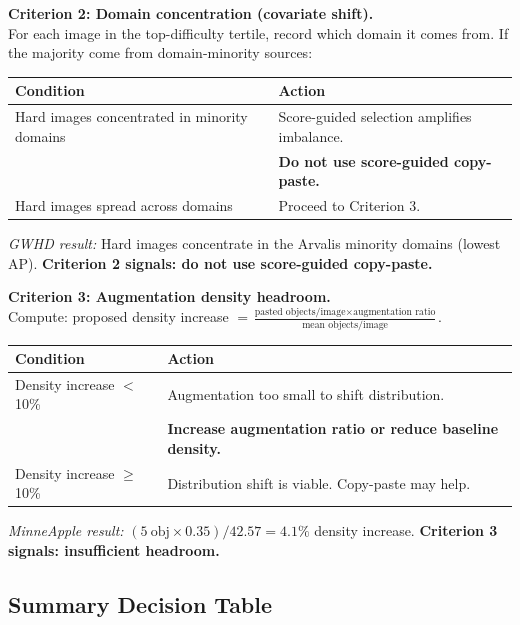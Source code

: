 \documentclass[10pt, a4paper]{article}
\begin{document}
\medskip
\textbf{Criterion 2: Domain concentration (covariate shift).}\\
For each image in the top-difficulty tertile, record which domain it
comes from. If the majority come from domain-minority sources:

\begin{center}
\small
\begin{tabular}{ll}
\toprule
\textbf{Condition} & \textbf{Action} \\
\midrule
Hard images concentrated in minority domains
  & Score-guided selection amplifies imbalance. \\
  & \textbf{Do not use score-guided copy-paste.} \\
Hard images spread across domains
  & Proceed to Criterion 3. \\
\bottomrule
\end{tabular}
\end{center}

\textit{GWHD result:} Hard images concentrate in the Arvalis minority
domains (lowest AP). \textbf{Criterion 2 signals: do not use score-guided
copy-paste.}

\medskip
\textbf{Criterion 3: Augmentation density headroom.}\\
Compute: proposed density increase $= \frac{\text{pasted objects/image} \times \text{augmentation ratio}}{\text{mean objects/image}}$.

\begin{center}
\small
\begin{tabular}{ll}
\toprule
\textbf{Condition} & \textbf{Action} \\
\midrule
Density increase $<$ 10\%
  & Augmentation too small to shift distribution. \\
  & \textbf{Increase augmentation ratio or reduce baseline density.} \\
Density increase $\geq$ 10\%
  & Distribution shift is viable. Copy-paste may help. \\
\bottomrule
\end{tabular}
\end{center}

\textit{MinneApple result:} $(5\ \text{obj} \times 0.35) / 42.57 = 4.1\%$
density increase. \textbf{Criterion 3 signals: insufficient headroom.}

\subsection{Summary Decision Table}
\end{document}
